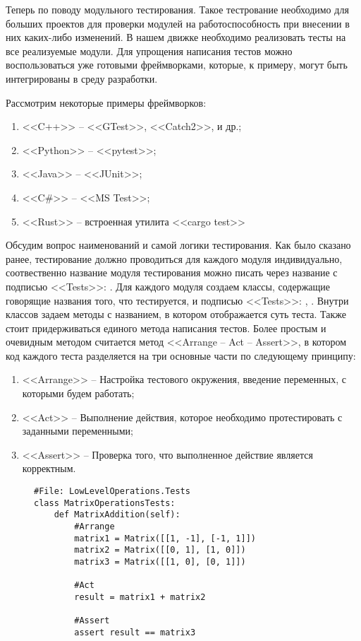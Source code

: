 	Теперь по поводу модульного тестирования. Такое тестрование необходимо для больших проектов для проверки модулей на работоспособность при внесении в них каких-либо изменений. В нашем движке необходимо реализовать тесты на все реализуемые модули. Для упрощения написания тестов можно воспользоваться уже готовыми фреймворками, которые, к примеру, могут быть интегрированы в среду разработки.

	Рассмотрим некоторые примеры фреймворков:
	\begin{enumerate}
		\item <<C++>> -- <<GTest>>, <<Catch2>>, и др.;
		\item <<Python>> -- <<pytest>>;
		\item <<Java>> -- <<JUnit>>;
		\item <<C\#>> -- <<MS Test>>;
		\item <<Rust>> -- встроенная утилита <<cargo test>>
	\end{enumerate}

	Обсудим вопрос наименований и самой логики тестирования. Как было сказано ранее, тестирование должно проводиться для каждого модуля индивидуально, соотвественно название модуля тестирования можно писать через название с подписью <<Tests>>: . Для каждого модуля создаем классы, содержащие говорящие названия того, что тестируется, и подписью <<Tests>>: , . Внутри классов задаем методы с названием, в котором отображается суть теста. Также стоит придерживаться единого метода написания тестов. Более простым и очевидным методом считается метод <<Arrange -- Act -- Assert>>, в котором код каждого теста разделяется на три основные части по следующему принципу:
	\begin{enumerate}
		\item <<Arrange>> -- Настройка тестового окружения, введение переменных, с которыми будем работать;
		\item <<Act>> -- Выполнение действия, которое необходимо протестировать с заданными переменными;
		\item <<Assert>> -- Проверка того, что выполненное действие является корректным.
	\end{enumerate} 

	\begin{figure}[H]
		\begin{lstlisting}[caption=<<Пример (Python)>>]
#File: LowLevelOperations.Tests
class MatrixOperationsTests:
	def MatrixAddition(self):
		#Arrange
		matrix1 = Matrix([[1, -1], [-1, 1]])
		matrix2 = Matrix([[0, 1], [1, 0]])
		matrix3 = Matrix([[1, 0], [0, 1]])

		#Act
		result = matrix1 + matrix2

		#Assert
		assert result == matrix3
		\end{lstlisting}
	\end{figure}

